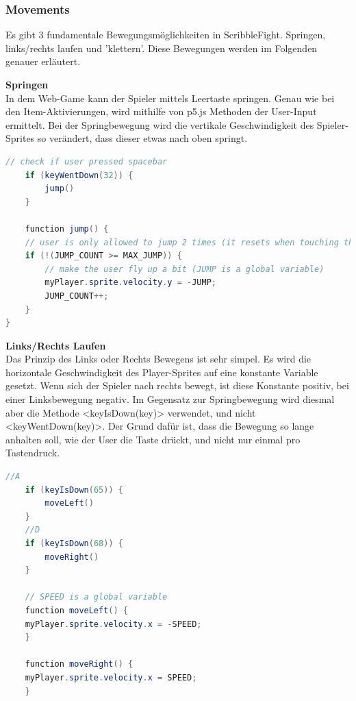 \subsubsection{Movements}
Es gibt 3 fundamentale Bewegungsmöglichkeiten in ScribbleFight. Springen, links/rechts laufen und 'klettern'. Diese Bewegungen werden im Folgenden genauer erläutert.

\textbf{Springen}
\\
In dem Web-Game kann der Spieler mittels Leertaste springen. Genau wie bei den Item-Aktivierungen, wird mithilfe von p5.js Methoden der User-Input ermittelt.
Bei der Springbewegung wird die vertikale Geschwindigkeit des Spieler-Sprites so verändert, dass dieser etwas nach oben springt.
\\
\begin{lstlisting}[caption=Jumping,language=Java,label=lst:impl:jumping]
    // check if user pressed spacebar
    if (keyWentDown(32)) {
        jump()
    }

    function jump() {
    // user is only allowed to jump 2 times (it resets when touching the ground)
    if (!(JUMP_COUNT >= MAX_JUMP)) {
        // make the user fly up a bit (JUMP is a global variable)
        myPlayer.sprite.velocity.y = -JUMP;
        JUMP_COUNT++;
    }
}
\end{lstlisting}

\textbf{Links/Rechts Laufen}
\\
Das Prinzip des Links oder Rechts Bewegens ist sehr simpel. Es wird die horizontale Geschwindigkeit des Player-Sprites auf eine konstante Variable gesetzt.
Wenn sich der Spieler nach rechts bewegt, ist diese Konstante positiv, bei einer Linksbewegung negativ. Im Gegensatz zur Springbewegung wird diesmal aber die Methode <keyIsDown(key)> verwendet, und nicht <keyWentDown(key)>.
Der Grund dafür ist, dass die Bewegung so lange anhalten soll, wie der User die Taste drückt, und nicht nur einmal pro Tastendruck.

\begin{lstlisting}[caption=Links/Rechts-Movement,language=Java,label=lst:impl:moving]
    //A
    if (keyIsDown(65)) {
        moveLeft()
    }
    //D
    if (keyIsDown(68)) {
        moveRight()
    }

    // SPEED is a global variable
    function moveLeft() {
    myPlayer.sprite.velocity.x = -SPEED;
    }

    function moveRight() {
    myPlayer.sprite.velocity.x = SPEED;
    }
\end{lstlisting}

